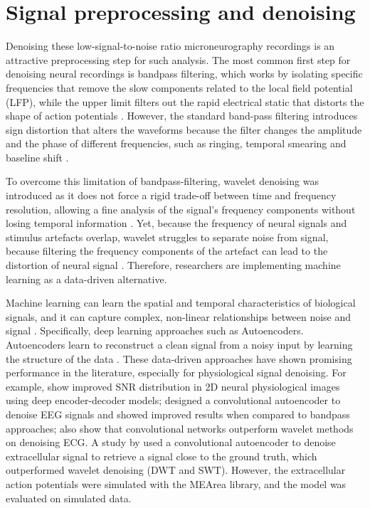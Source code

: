 \documentclass[ %
                    author={Rzan Alkabier},
                    supervisor={Dr. Zahraa Abdallah},
                    degree={MSc},
                     title={Denoising Extracellular Recording for Spike Detection and Classification on Single Channels},
                    subtitle={Does denoising improve detection and classification performance?},
                      type={},
                      year={2026}]{dissertation}
\begin{document}
\noindent
\section{Signal preprocessing and denoising}
\label{sec:denoising}
Denoising these low-signal-to-noise ratio microneurography recordings is an attractive preprocessing step for such analysis. The most common first step for denoising neural recordings is bandpass filtering, which works by isolating specific frequencies that remove the slow components related to the local field potential (LFP), while the upper limit filters out the rapid electrical static that distorts the shape of action potentials \cite{kechris_removing_2021}. However, the standard band-pass filtering introduces sign distortion that alters the waveforms because the filter changes the amplitude and the phase of different frequencies, such as ringing, temporal smearing and baseline shift \cite{de_cheveigne_filters_2019, wiltschko_wavelet_2008}. 
\bigskip

\noindent
To overcome this limitation of bandpass-filtering, wavelet denoising was introduced as it does not force a rigid trade-off between time and frequency resolution, allowing a fine analysis of the signal's frequency components without losing temporal information \cite{baldazzi_systematic_2020}. Yet, because the frequency of neural signals and stimulus artefacts overlap, wavelet struggles to separate noise from signal, because filtering the frequency components of the artefact can lead to the distortion of neural signal \cite{zhang_dual-domain_2026}.  Therefore, researchers are implementing machine learning as a data-driven alternative.  
\bigskip

\noindent
Machine learning can learn the spatial and temporal characteristics of biological signals, and it can capture complex, non-linear relationships between noise and signal \cite{ribeiro_denoising_2023}. Specifically, deep learning approaches such as Autoencoders. Autoencoders learn to reconstruct a clean signal from a noisy input by learning the structure of the data \cite{kechris_removing_2021, bengio_generalized_2013}. These data-driven approaches have shown promising performance in the literature, especially for physiological signal denoising. For example, \cite{lecoq_removing_2021} show improved SNR distribution in 2D neural physiological images using deep encoder-decoder models; \cite{leite_deep_2018} designed a convolutional autoencoder to denoise EEG signals and showed improved results when compared to bandpass approaches; \cite{arsene_design_2020} also show that convolutional networks outperform wavelet methods on denoising ECG. A study by \cite{kechris_removing_2021} used a convolutional autoencoder to denoise extracellular signal to retrieve a signal close to the ground truth, which outperformed wavelet denoising (DWT and SWT). However, the extracellular action potentials were simulated with the MEArea library, and the model was evaluated on simulated data.
\bigskip
\end{document}
